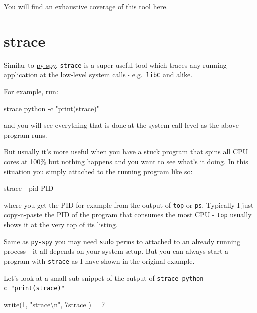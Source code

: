\documentclass[
]{report}
\newenvironment{Shaded}{\begin{snugshade}}{\end{snugshade}}
\newcommand{\AttributeTok}[1]{\textcolor[rgb]{0.40,0.45,0.13}{#1}}
\newcommand{\ErrorTok}[1]{\textcolor[rgb]{0.68,0.00,0.00}{#1}}
\newcommand{\ExtensionTok}[1]{\textcolor[rgb]{0.00,0.23,0.31}{#1}}
\newcommand{\FunctionTok}[1]{\textcolor[rgb]{0.28,0.35,0.67}{#1}}
\newcommand{\KeywordTok}[1]{\textcolor[rgb]{0.00,0.23,0.31}{#1}}
\newcommand{\NormalTok}[1]{\textcolor[rgb]{0.00,0.23,0.31}{#1}}
\newcommand{\StringTok}[1]{\textcolor[rgb]{0.13,0.47,0.30}{#1}}
\begin{document}
You will find an exhaustive coverage of this tool
\href{./torch-distributed-hanging-solutions.md\#py-spy}{here}.

\section{strace}\label{strace}

Similar to
\href{./torch-distributed-hanging-solutions.md\#py-spy}{py-spy},
\texttt{strace} is a super-useful tool which traces any running
application at the low-level system calls - e.g.~\texttt{libC} and
alike.

For example, run:

\begin{Shaded}
\begin{Highlighting}[]
\ExtensionTok{strace}\NormalTok{ python }\AttributeTok{{-}c} \StringTok{"print(\textquotesingle{}strace\textquotesingle{})"}
\end{Highlighting}
\end{Shaded}

and you will see everything that is done at the system call level as the
above program runs.

But usually it's more useful when you have a stuck program that spins
all CPU cores at 100\% but nothing happens and you want to see what's it
doing. In this situation you simply attached to the running program like
so:

\begin{Shaded}
\begin{Highlighting}[]
\ExtensionTok{strace} \AttributeTok{{-}{-}pid}\NormalTok{ PID}
\end{Highlighting}
\end{Shaded}

where you get the PID for example from the output of \texttt{top} or
\texttt{ps}. Typically I just copy-n-paste the PID of the program that
consumes the most CPU - \texttt{top} usually shows it at the very top of
its listing.

Same as \texttt{py-spy} you may need \texttt{sudo} perms to attached to
an already running process - it all depends on your system setup. But
you can always start a program with \texttt{strace} as I have shown in
the original example.

Let's look at a small sub-snippet of the output of
\texttt{strace\ python\ -c\ "print(\textquotesingle{}strace\textquotesingle{})"}

\begin{Shaded}
\begin{Highlighting}[]
\FunctionTok{write}\ErrorTok{(}\ExtensionTok{1,} \StringTok{"strace\textbackslash{}n"}\NormalTok{, 7strace}
\KeywordTok{)}                 \ExtensionTok{=}\NormalTok{ 7}
\end{Highlighting}
\end{Shaded}
\end{document}
